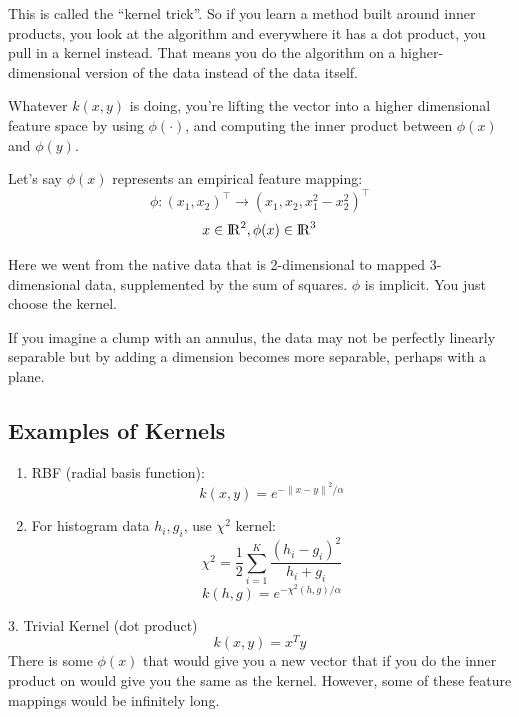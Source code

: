 \documentclass[a4paper]{article}
\begin{document}
This is called the ``kernel trick''.  So if you learn a method built around inner products, you look at the algorithm and everywhere it has a dot product, you pull in a kernel instead.  That means you do the algorithm on a higher-dimensional version of the data instead of the data itself.

Whatever $k(x,y)$ is doing, you're lifting the vector into a higher dimensional feature space by using  $ \phi(\cdot)$, and computing  the inner product between $ \phi(x)$ and $ \phi(y)$. 

Let's say $\phi(x)$ represents an empirical feature mapping:
$$
\phi: (x_1, x_2)^\top \rightarrow (x_1, x_2, x_1^2-x_2^2)^\top
$$
$$
x \in {\rm I\!R}^2, \phi(x) \in {\rm I\!R}^3
$$

Here we went from the native data that is 2-dimensional to mapped 3-dimensional data, supplemented by the sum of squares. $\phi$ is implicit. You just choose the kernel.

If you imagine a clump with an annulus, the data may not be perfectly linearly separable but by adding a dimension becomes more separable, perhaps with a plane.

\subsection{Examples of Kernels}

\begin{enumerate}
\item
RBF (radial basis function):
$$
k(x,y) = e^{-{\| x-y \|}^2 / \alpha}
$$

\item For histogram data $h_i, g_i$, use $\chi^2$ kernel:
$$
\chi^2 = \frac{1}{2} \sum_{i=1}^{K} \frac{{(h_i-g_i)}^2}{h_i+g_i}
$$
$$
k(h,g) = e^{-\chi^2(h,g) / \alpha}
$$
\end{enumerate}

	3. Trivial Kernel (dot product)
    $$k(x,y) = x^Ty$$
There is some $\phi(x)$ that would give you a new vector that if you do the inner product on would give you the same as the kernel.  However, some of these feature mappings would be infinitely long.  
\end{document}
